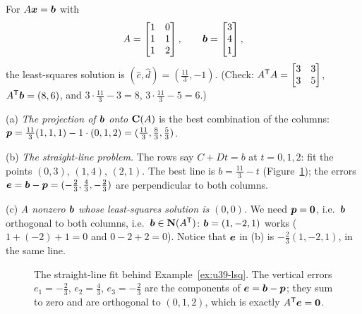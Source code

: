 \begin{example}\label{ex:u39-lsq}
For $A\boldsymbol{x}=\boldsymbol{b}$ with
\[
A=\begin{bmatrix}1&0\\1&1\\1&2\end{bmatrix},\qquad \boldsymbol{b}=\begin{bmatrix}3\\4\\1\end{bmatrix},
\]
the least-squares solution is $(\hat c,\hat d)=(\tfrac{11}{3},-1)$. (Check: $A^{\mathsf{T}} A=\begin{bmatrix}3&3\\3&5\end{bmatrix}$, $A^{\mathsf{T}}\boldsymbol{b}=(8,6)$, and $3\cdot\tfrac{11}{3}-3=8$, $3\cdot\tfrac{11}{3}-5=6$.)

(a) \emph{The projection of $\boldsymbol{b}$ onto $\mathbf{C}(A)$} is the best combination of the columns: $\boldsymbol{p}=\tfrac{11}{3}(1,1,1)-1\cdot(0,1,2)=(\tfrac{11}{3},\tfrac83,\tfrac53)$.

(b) \emph{The straight-line problem.} The rows say $C+Dt=b$ at $t=0,1,2$: fit the points $(0,3)$, $(1,4)$, $(2,1)$. The best line is $b=\tfrac{11}{3}-t$ (Figure~\ref{fig:u39-line}); the errors $\boldsymbol{e}=\boldsymbol{b}-\boldsymbol{p}=(-\tfrac23,\tfrac43,-\tfrac23)$ are perpendicular to both columns.

(c) \emph{A nonzero $\boldsymbol{b}$ whose least-squares solution is $(0,0)$.} We need $\boldsymbol{p}=\boldsymbol{0}$, i.e.\ $\boldsymbol{b}$ orthogonal to both columns, i.e.\ $\boldsymbol{b}\in\mathbf{N}(A^{\mathsf{T}})$: $\boldsymbol{b}=(1,-2,1)$ works ($1+(-2)+1=0$ and $0-2+2=0$). Notice that $\boldsymbol{e}$ in (b) is $-\tfrac23(1,-2,1)$, in the same line.
\end{example}

\begin{figure}[ht]\centering
{}
\caption{The straight-line fit behind Example~\ref{ex:u39-lsq}. The vertical errors $e_1=-\tfrac23$, $e_2=\tfrac43$, $e_3=-\tfrac23$ are the components of $\boldsymbol{e}=\boldsymbol{b}-\boldsymbol{p}$; they sum to zero and are orthogonal to $(0,1,2)$, which is exactly $A^{\mathsf{T}}\boldsymbol{e}=\boldsymbol{0}$.}\label{fig:u39-line}
\end{figure}

